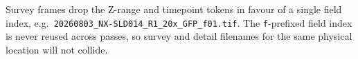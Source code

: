 \begin{tcolorbox}[infobox,title=\faFile\ Survey-Pass Variant]
Survey frames drop the Z-range and timepoint tokens in favour of a single
field index, e.g.\ \texttt{20260803\_NX-SLD014\_R1\_20x\_GFP\_f01.tif}. The
\texttt{f}-prefixed field index is never reused across passes, so survey and
detail filenames for the same physical location will not collide.
\end{tcolorbox}
